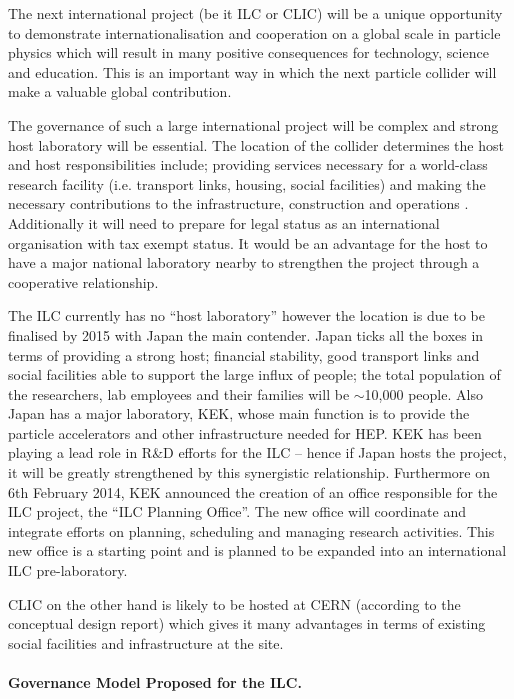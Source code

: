 The next international project (be it ILC or CLIC) will be a unique opportunity to demonstrate internationalisation and cooperation on a global scale in particle physics which will result in many positive consequences for technology, science and education. This is an important way in which the next particle collider will make a valuable global contribution.

The governance of such a large international project will be complex and strong host laboratory will be essential. The location of the collider determines the host and host responsibilities include; providing services necessary for a world-class research facility (i.e. transport links, housing, social facilities) and making the necessary contributions to the infrastructure, construction and operations . Additionally it will need to prepare for legal status as an international organisation with tax exempt status. It would be an advantage for the host to have a major national laboratory nearby to strengthen the project through a cooperative relationship.

The ILC currently has no ``host laboratory'' however the location is due to be finalised by 2015 with Japan the main contender. Japan ticks all the boxes in terms of providing a strong host; financial stability, good transport links and social facilities able to support the large influx of people; the total population of the researchers, lab employees and their families will be $\sim$10,000 people. Also Japan has a major laboratory, KEK, whose main function is to provide the particle accelerators and other infrastructure needed for HEP. KEK has been playing a lead role in R\&D efforts for the ILC – hence if Japan hosts the project, it will be greatly strengthened by this synergistic relationship. Furthermore on 6th February 2014, KEK announced the creation of an office responsible for the ILC project, the ``ILC Planning Office''. The new office will coordinate and integrate efforts on planning, scheduling and managing research activities. This new office is a starting point and is planned to be expanded into an international ILC pre-laboratory. \cite{LCC:Press2}

CLIC on the other hand is likely to be hosted at CERN (according to the conceptual design report) which gives it many advantages in terms of existing social facilities and infrastructure at the site.

\paragraph{Governance Model Proposed for the ILC.}

